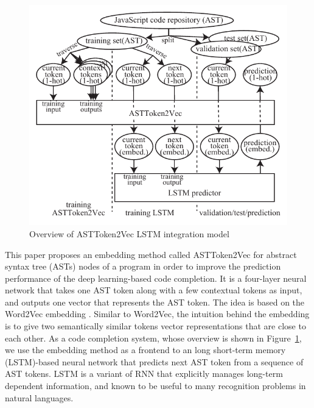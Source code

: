 \documentclass[E]{compsoft}
\begin{document}
\begin{figure}[!ht]
\centering
\includegraphics[scale=0.9]{pictures/overview.pdf}
\caption{Overview of ASTToken2Vec LSTM integration model}
\label{fig:overivew_model}
\end{figure}
This paper proposes an embedding method called ASTToken2Vec for abstract syntax tree (ASTs) nodes of a program in order to improve the prediction performance of the deep learning-based code completion. 
It is a four-layer neural network that takes one AST token along with a few contextual tokens as input, and outputs one vector that represents the AST token.  The idea is based on the Word2Vec embedding \cite{word2vec}.  Similar to Word2Vec, the intuition behind the embedding is to give two semantically similar tokens vector representations that are close to each other.
As a code completion system, whose overview is shown in Figure~\ref{fig:overivew_model}, we use the embedding method as a frontend to an long short-term memory (LSTM)-based neural network that predicts next AST token from a sequence of AST tokens.  LSTM is a variant of RNN that explicitly manages long-term dependent information, and known to be useful to many recognition problems in natural languages.
\end{document}
